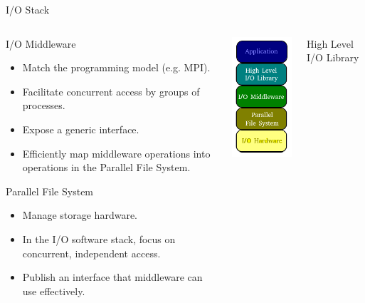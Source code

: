 \documentclass[compress,11pt,xcolor=svgnames,aspectratio=169]{beamer}
\begin{document}
\begin{frame}[fragile]{I/O Stack}

{\tiny

\begin{columns}
\begin{column}{0.45\textwidth}
\begin{block}{I/O Middleware}
\begin{itemize}
\item Match the programming model (e.g. MPI).
\item Facilitate concurrent access by groups of processes.
\item Expose a generic interface.
\item Efficiently map middleware operations into operations in the Parallel File System.
\end{itemize}
\end{block}
\begin{block}{Parallel File System}
\begin{itemize}
\item Manage storage hardware.
\item In the I/O software stack, focus on concurrent, independent access.
\item Publish an interface that middleware can use effectively.
\end{itemize}
\end{block}
\end{column}
\begin{column}{0.25\textwidth}
\begin{center}
\includegraphics[scale=0.8]{fig/io-stack}
\end{center}
\end{column}
\begin{column}{0.28\textwidth}
\begin{block}{High Level I/O Library}

\end{block}
\end{column}
\end{columns}}
\end{frame}
\end{document}
